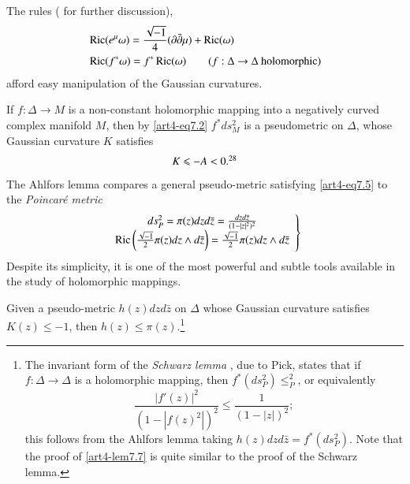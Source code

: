 The rules (\cf \cite{art4-key24} for further discussion),
\begin{align*}
& \operatorname{Ric} (e^\mu \omega) = \frac{\sqrt{-1}}{4} (\partial \bar{\partial} \mu) + \operatorname{Ric} (\omega)\\
& \operatorname{Ric} (f^\ast\omega) = f^\ast \operatorname{Ric} (\omega) \qquad (f: \Delta \to \Delta \text{ holomorphic})
\end{align*}
afford easy manipulation of the Gaussian curvatures.

If $f : \Delta \to M$ is a non-constant holomorphic mapping into a negatively curved complex manifold $M$, then by \eqref{art4-eq7.2} $f^\ast ds^2_M$ is a pseudometric on $\Delta$, whose Gaussian curvature $K$ satisfies
\begin{equation}
K \leqslant - A < 0.\footnotemark[28]{}
\label{art4-eq7.5}
\end{equation}
The Ahlfors lemma compares a general pseudo-metric satisfying \eqref{art4-eq7.5} to the \textit{Poincar\'e metric}
\begin{equation}
\left.
\begin{array}{c}
ds^2_P = \pi (z) dzd\bar{z}= \frac{dzd\bar{z}}{(1-|z|^2)^2}\\
\operatorname{Ric} \left(\frac{\sqrt{-1}}{2} \pi (z) d z \wedge d\bar{z} \right) = \frac{\sqrt{-1}}{2} \pi (z) dz \wedge d \bar{z}
\end{array}
\right\}\label{art4-eq7.6}
\end{equation}
Despite its simplicity, it is one of the most powerful and subtle tools available in the study of holomorphic mappings.

\setcounter{lemma}{6}
\begin{lemma}[Ahlfors]\label{art4-lem7.7}
Given a pseudo-metric $h(z)dzd\bar{z}$ on $\Delta$ whose Gaussian curvature satisfies $K(z) \leqslant -1$, then $h (z) \leqslant \pi (z)$.\footnote[29]{The invariant form of the \textit{Schwarz lemma} \cite{art4-key28}, due to Pick, states that if $f : \Delta \to \Delta$ is a holomorphic mapping, then $f^\ast (ds^2_P) \leqslant^2_P$, or equivalently
$$
\dfrac{|f'(z)|^2}{(1 -|f(z)^2|)^2} \leqslant \frac{1}{(1-|z|)^2};
$$
this follows from the Ahlfors lemma taking $h(z) dz d \bar{z} = f^\ast (ds^2_P)$. Note that the proof of \eqref{art4-lem7.7} is quite similar to the proof of the Schwarz lemma.}
\end{lemma}

